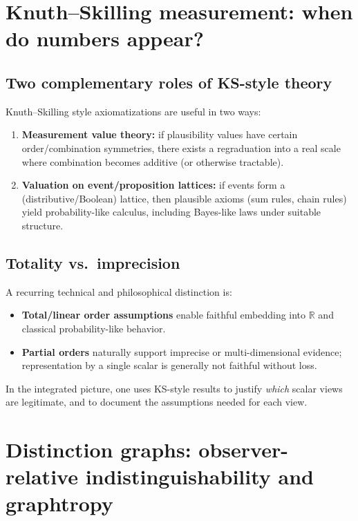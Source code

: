 \documentclass[11pt]{article}
\theoremstyle{definition}
\begin{document}
\section{Knuth--Skilling measurement: when do numbers appear?}

\subsection{Two complementary roles of KS-style theory}

Knuth--Skilling style axiomatizations are useful in two ways:
\begin{enumerate}[leftmargin=1.5em]
\item \textbf{Measurement value theory:} if plausibility values have certain order/combination symmetries,
there exists a regraduation into a real scale where combination becomes additive (or otherwise tractable).
\item \textbf{Valuation on event/proposition lattices:} if events form a (distributive/Boolean) lattice,
then plausible axioms (sum rules, chain rules) yield probability-like calculus, including Bayes-like laws under suitable structure.
\end{enumerate}

\subsection{Totality vs.\ imprecision}

A recurring technical and philosophical distinction is:
\begin{itemize}[leftmargin=1.5em]
\item \textbf{Total/linear order assumptions} enable faithful embedding into $\mathbb{R}$
and classical probability-like behavior.
\item \textbf{Partial orders} naturally support imprecise or multi-dimensional evidence;
representation by a single scalar is generally not faithful without loss.
\end{itemize}

In the integrated picture, one uses KS-style results to justify \emph{which} scalar views are legitimate,
and to document the assumptions needed for each view.

\section{Distinction graphs: observer-relative indistinguishability and graphtropy}
\end{document}
